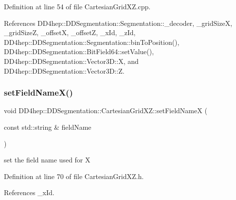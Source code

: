 Definition at line 54 of file Cartesian\+Grid\+X\+Z.\+cpp.



References D\+D4hep\+::\+D\+D\+Segmentation\+::\+Segmentation\+::\+\_\+decoder, \+\_\+grid\+SizeX, \+\_\+grid\+SizeZ, \+\_\+offsetX, \+\_\+offsetZ, \+\_\+x\+Id, \+\_\+z\+Id, D\+D4hep\+::\+D\+D\+Segmentation\+::\+Segmentation\+::bin\+To\+Position(), D\+D4hep\+::\+D\+D\+Segmentation\+::\+Bit\+Field64\+::set\+Value(), D\+D4hep\+::\+D\+D\+Segmentation\+::\+Vector3\+D\+::X, and D\+D4hep\+::\+D\+D\+Segmentation\+::\+Vector3\+D\+::Z.

\hypertarget{class_d_d4hep_1_1_d_d_segmentation_1_1_cartesian_grid_x_z_a2d1d365c962d662e90e53f07980bee2c}{}\label{class_d_d4hep_1_1_d_d_segmentation_1_1_cartesian_grid_x_z_a2d1d365c962d662e90e53f07980bee2c} 
\subsubsection{\texorpdfstring{set\+Field\+Name\+X()}{setFieldNameX()}}
{\footnotesize\ttfamily void D\+D4hep\+::\+D\+D\+Segmentation\+::\+Cartesian\+Grid\+X\+Z\+::set\+Field\+NameX (\begin{DoxyParamCaption}\item[{const std\+::string \&}]{field\+Name }\end{DoxyParamCaption})\hspace{0.3cm}{\ttfamily [inline]}}



set the field name used for X 



Definition at line 70 of file Cartesian\+Grid\+X\+Z.\+h.



References \+\_\+x\+Id.

\hypertarget{class_d_d4hep_1_1_d_d_segmentation_1_1_cartesian_grid_x_z_a46cc52729cf997b7e0ba497b43476fe2}{}\label{class_d_d4hep_1_1_d_d_segmentation_1_1_cartesian_grid_x_z_a46cc52729cf997b7e0ba497b43476fe2} 
